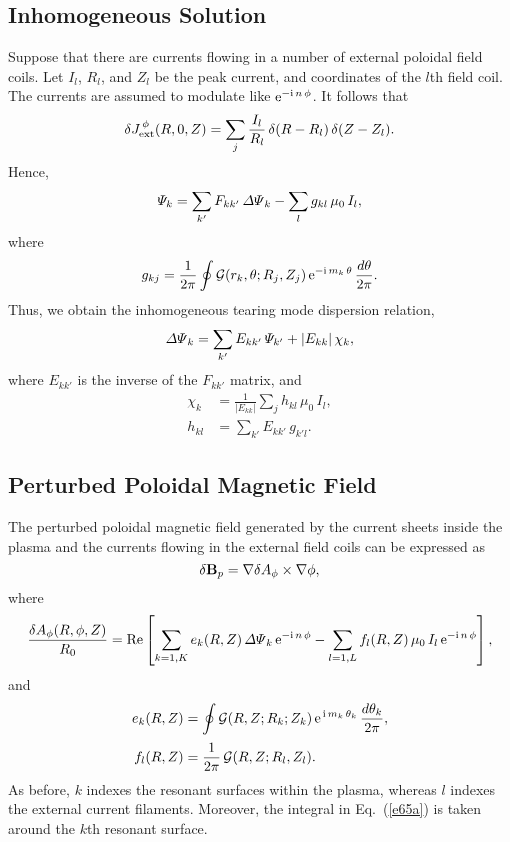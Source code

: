 \documentclass[12pt]{article}
\begin{document}
\subsection{Inhomogeneous Solution}
Suppose that there are currents flowing in a number of external poloidal field
coils. Let $I_l$, $R_l$, and $Z_l$ be the peak current, and coordinates of the
$l$th field coil. The currents are assumed to modulate like ${\rm e}^{-{\rm i}\,n\,\phi}$. It follows that
\begin{equation}
\delta J^{\,\phi}_{\rm ext}(R,0,Z)=\sum_j\frac{I_l}{R_l}\,\delta(R-R_l)\,\delta (Z-Z_l).
\end{equation}
Hence,
\begin{equation}
{\mit\Psi}_k = \sum_{k'} F_{kk'}\,{\mit\Delta\Psi}_k - \sum_lg_{kl}\,\mu_0\,I_l,
\end{equation}
where
\begin{equation}
g_{kj} = \frac{1}{2\pi}\oint {\cal G}(r_k,\theta;R_j,Z_j)\,{\rm e}^{-{\rm i}\,m_k\,\theta}\,\frac{d\theta}{2\pi}.
\end{equation}
Thus, we obtain the inhomogeneous tearing mode dispersion relation, 
\begin{equation}
{\mit\Delta\Psi}_k =\sum_{k'} E_{kk'}\,{\mit\Psi}_{k'}+ |E_{kk}|\,\chi_k, \label{e68}
\end{equation}
where $E_{kk'}$ is the inverse of the $F_{kk'}$ matrix, 
and 
\begin{align}
\chi_k&=\frac{1}{|E_{kk}|} \sum_j h_{kl}\,\mu_0\,I_l,\\[0.5ex]
h_{kl} &= \sum_{k'} E_{kk'} \,g_{k'l}. 
\end{align}

\subsection{Perturbed Poloidal Magnetic Field}
The perturbed poloidal magnetic field generated by the
current sheets inside the plasma and the currents flowing
in the external field coils can be expressed as 
\begin{equation}
\delta {\bf B}_p = \nabla \delta A_\phi\times\nabla\phi,
\end{equation}
where
\begin{equation}
\frac{\delta A_\phi(R,\phi,Z)}{R_0} = {\rm Re}\left[
\sum_{k=1,K} e_k(R,Z)\,{\mit\Delta\Psi}_k\,{\rm e}^{-{\rm i}\,n\,\phi}
-\sum_{l=1,L} f_l(R,Z)\,\mu_0\,I_l\,{\rm e}^{-{\rm i}\,n\,\phi}\right],
\end{equation}
and
\begin{align}
e_k(R,Z) &= \oint {\cal G}(R,Z;R_k;Z_k)\,{\rm e}^{\,{\rm i}\,m_k\,\theta_k}\,\frac{d\theta_k}{2\pi},\label{e65a}\\[0.5ex]
f_l(R,Z) &=  \frac{1}{2\pi}\,{\cal G}(R,Z;R_l,Z_l).
\end{align}
As before, $k$ indexes the resonant surfaces within the plasma, whereas $l$ indexes the external current filaments.  Moreover, the integral in Eq.~(\ref{e65a}) is taken around the
$k$th resonant surface.
\end{document}
